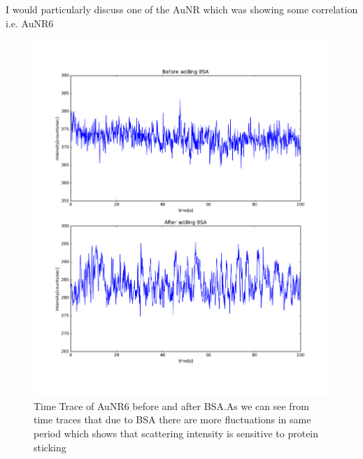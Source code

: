 \documentclass[twoside,single]{lion-msc}
\begin{document}
\newpage
I would particularly discuss one of the AuNR which was showing some correlation i.e. AuNR6
\begin{figure}[H]
\includegraphics[width=1\textwidth,center]{11}
\begin{center}
\caption {Time Trace of AuNR6 before and after BSA.As we can see from time traces that due to BSA there are more fluctuations in same period which shows that scattering intensity is sensitive to protein sticking}
\end{center}
\end{figure}
\end{document}
